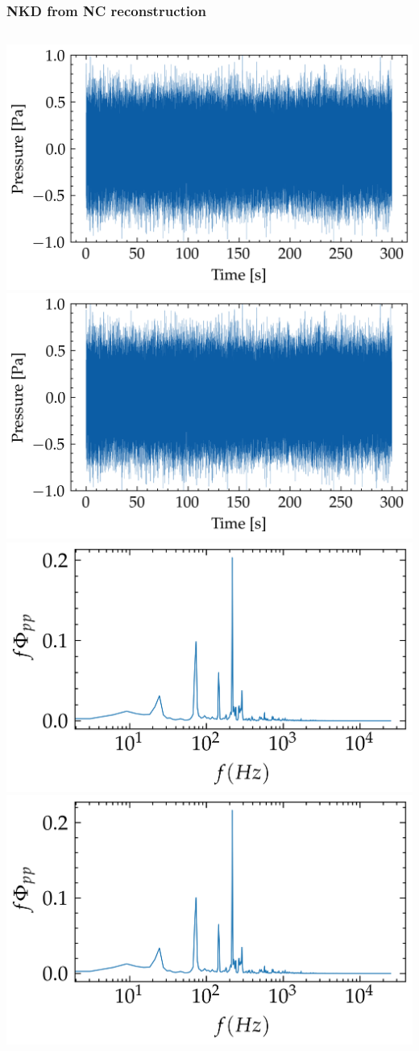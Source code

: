 \documentclass[aspectratio=169,10pt]{beamer}
\begin{document}
\begin{frame}
    \frametitle{NKD from NC reconstruction}
    \begin{columns}[c] %
            \centering
            \includegraphics[width=0.6\linewidth]{../figures/cali_09/flow/raw/nc_atm.png}
            \includegraphics[width=0.6\linewidth]{../figures/cali_09/flow/raw/nkd_recon_from_nc_atm.png}
            \centering
            \includegraphics[width=0.6\linewidth]{../figures/cali_09/flow/raw/Pyy_nc_raw_atm.png}
            \includegraphics[width=0.6\linewidth]{../figures/cali_09/flow/raw/Pyy_nkd_from_nc_atm.png}
    \end{columns}
\end{frame}
\end{document}
